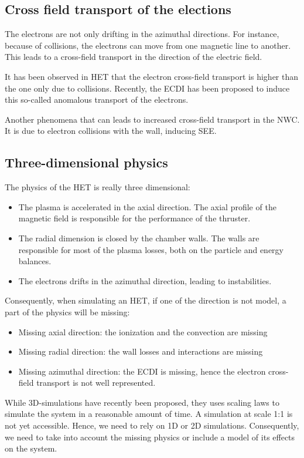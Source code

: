 \subsection{Cross field transport of the elections}
The electrons are not only drifting in the azimuthal directions.
For instance, because of collisions, the electrons can move from one magnetic line to another.
This leads to a cross-field transport in the direction of the electric field.

It has been observed in \ac{HET} that the electron cross-field transport is higher than the one only due to collisions.
Recently, the \ac{ECDI} has been proposed to induce this so-called anomalous transport of the electrons.

Another phenomena that can leads to increased cross-field transport in the \ac{NWC}.
It is due to electron collisions with the wall, inducing \ac{SEE}.


\subsection{Three-dimensional physics}
\label{sec-3Dphi}

The physics of the \ac{HET} is really three dimensional:

\begin{itemize}
  \item The plasma is accelerated in the axial direction. The axial profile of the magnetic field is responsible for the performance of the thruster.
  \item The radial dimension is closed by the chamber walls. The walls are responsible for most of the plasma losses, both on the particle and energy balances.
  \item The electrons drifts in the azimuthal direction, leading to instabilities.
\end{itemize}

Consequently, when simulating an \ac{HET}, if one of the direction is not model, a part of the physics will be missing:
\begin{itemize}
  \item Missing axial direction: the ionization and the convection are missing
  \item Missing radial direction: the wall losses and interactions are missing
  \item Missing azimuthal direction: the \ac{ECDI} is missing, hence the electron cross-field transport is not well represented.
\end{itemize}

While 3D-simulations have recently been proposed, they uses scaling laws to simulate the system in a reasonable amount of time.
A simulation at scale {1:1} is not yet accessible.
Hence, we need to rely on \ac{1D} or \ac{2D} simulations.
Consequently, we need to take into account the missing physics or include a model of its effects on the system.
